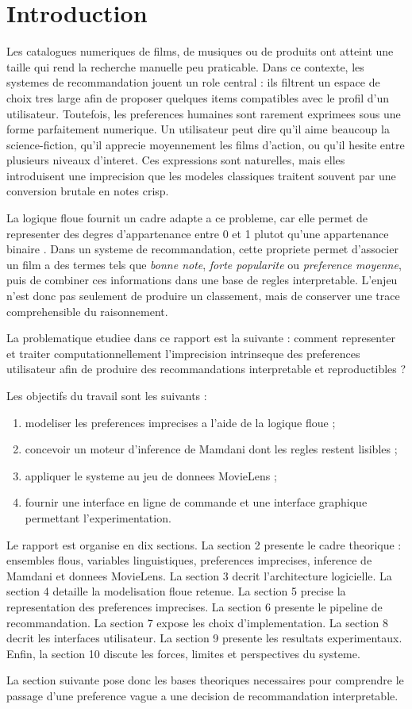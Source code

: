 \section{Introduction}

Les catalogues numeriques de films, de musiques ou de produits ont atteint une taille qui rend la recherche manuelle peu praticable. Dans ce contexte, les systemes de recommandation jouent un role central : ils filtrent un espace de choix tres large afin de proposer quelques items compatibles avec le profil d'un utilisateur. Toutefois, les preferences humaines sont rarement exprimees sous une forme parfaitement numerique. Un utilisateur peut dire qu'il aime beaucoup la science-fiction, qu'il apprecie moyennement les films d'action, ou qu'il hesite entre plusieurs niveaux d'interet. Ces expressions sont naturelles, mais elles introduisent une imprecision que les modeles classiques traitent souvent par une conversion brutale en notes crisp.

La logique floue fournit un cadre adapte a ce probleme, car elle permet de representer des degres d'appartenance entre 0 et 1 plutot qu'une appartenance binaire \cite{zadeh1965,ross2010}. Dans un systeme de recommandation, cette propriete permet d'associer un film a des termes tels que \emph{bonne note}, \emph{forte popularite} ou \emph{preference moyenne}, puis de combiner ces informations dans une base de regles interpretable. L'enjeu n'est donc pas seulement de produire un classement, mais de conserver une trace comprehensible du raisonnement.

La problematique etudiee dans ce rapport est la suivante : comment representer et traiter computationnellement l'imprecision intrinseque des preferences utilisateur afin de produire des recommandations interpretable et reproductibles ? 

Les objectifs du travail sont les suivants :
\begin{enumerate}
  \item modeliser les preferences imprecises a l'aide de la logique floue ;
  \item concevoir un moteur d'inference de Mamdani dont les regles restent lisibles ;
  \item appliquer le systeme au jeu de donnees MovieLens ;
  \item fournir une interface en ligne de commande et une interface graphique permettant l'experimentation.
\end{enumerate}

Le rapport est organise en dix sections. La section 2 presente le cadre theorique : ensembles flous, variables linguistiques, preferences imprecises, inference de Mamdani et donnees MovieLens. La section 3 decrit l'architecture logicielle. La section 4 detaille la modelisation floue retenue. La section 5 precise la representation des preferences imprecises. La section 6 presente le pipeline de recommandation. La section 7 expose les choix d'implementation. La section 8 decrit les interfaces utilisateur. La section 9 presente les resultats experimentaux. Enfin, la section 10 discute les forces, limites et perspectives du systeme.

La section suivante pose donc les bases theoriques necessaires pour comprendre le passage d'une preference vague a une decision de recommandation interpretable.

